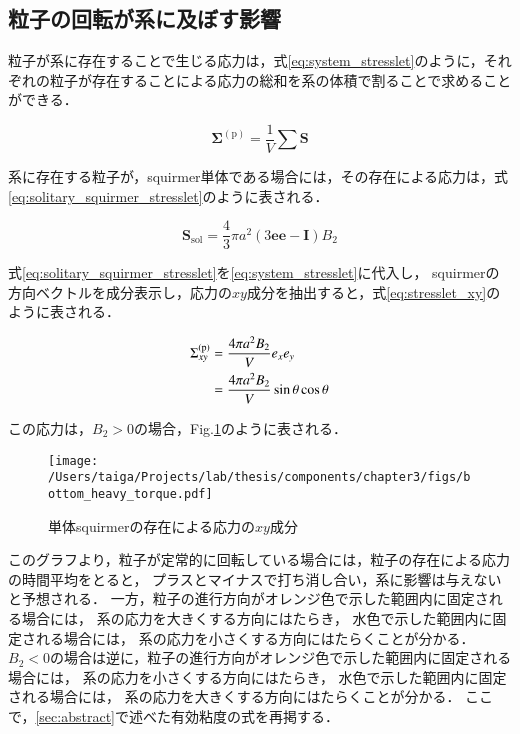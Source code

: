 \subsection{粒子の回転が系に及ぼす影響}
粒子が系に存在することで生じる応力は，式\eqref{eq:system_stresslet}のように，それぞれの粒子が存在することによる応力の総和を系の体積で割ることで求めることができる．

    \begin{equation}
        \boldsymbol{\Sigma}^\mathrm{(p)} = \frac{1}{V} \sum \boldsymbol{S}
        \label{eq:system_stresslet}
    \end{equation}

\noindent
系に存在する粒子が，squirmer単体である場合には，その存在による応力は，式\eqref{eq:solitary_squirmer_stresslet}のように表される．

    \begin{equation}
        \boldsymbol{S}_\mathrm{sol} = \frac{4}{3} \pi a^2 (3 \boldsymbol{ee} - \boldsymbol{I}) B_2
        \label{eq:solitary_squirmer_stresslet}
    \end{equation}

\noindent
式\eqref{eq:solitary_squirmer_stresslet}を\eqref{eq:system_stresslet}に代入し，
squirmerの方向ベクトルを成分表示し，応力の$xy$成分を抽出すると，式\eqref{eq:stresslet_xy}のように表される．

    \begin{align}
        \Sigma^\mathrm{(p)}_{xy} &= \frac{4 \pi a^2 B_2}{V} e_x e_y \notag \\
            &= \frac{4 \pi a^2 B_2}{V} \sin \theta \cos \theta
        \label{eq:stresslet_xy}
    \end{align}

\noindent
この応力は，$B_2 > 0$の場合，Fig.\ref{fig:stresslet_xy}のように表される．

    \begin{figure}[H]
        \centering
        \texttt{[image: /Users/taiga/Projects/lab/thesis/components/chapter3/figs/bottom\_heavy\_torque.pdf]}
        \caption{単体squirmerの存在による応力の$xy$成分}
        \label{fig:stresslet_xy}
    \end{figure}

\noindent
このグラフより，粒子が定常的に回転している場合には，粒子の存在による応力の時間平均をとると，
プラスとマイナスで打ち消し合い，系に影響は与えないと予想される．
一方，粒子の進行方向がオレンジ色で示した範囲内に固定される場合には，
系の応力を大きくする方向にはたらき，
水色で示した範囲内に固定される場合には，
系の応力を小さくする方向にはたらくことが分かる．
$B_2<0$の場合は逆に，粒子の進行方向がオレンジ色で示した範囲内に固定される場合には，
系の応力を小さくする方向にはたらき，
水色で示した範囲内に固定される場合には，
系の応力を大きくする方向にはたらくことが分かる．
ここで，\ref{sec:abstract}で述べた有効粘度の式を再掲する．

